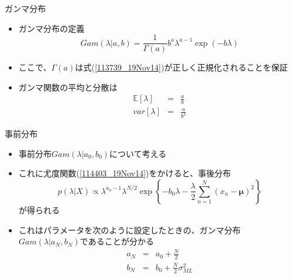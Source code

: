 \begin{frame}{ガンマ分布}
 \begin{itemize}
  \item ガンマ分布の定義
        \begin{equation}
         Gam(\lambda|a,b) = \frac{1}{\Gamma(a)}b^a\lambda^{a-1}\exp(-b\lambda)\label{113739_19Nov14}
        \end{equation}
  \item ここで、$\Gamma(a)$は式(\ref{113739_19Nov14})が正しく正規化されることを保証
  \item ガンマ関数の平均と分散は
        \begin{eqnarray}
         \mathbb{E}[\lambda] &=& \frac{a}{b}\\
         var[\lambda]& =& \frac{a}{b^2}
        \end{eqnarray}
 \end{itemize}
\end{frame}

\begin{frame}{事前分布}
 \begin{itemize}
  \item 事前分布$Gam(\lambda|a_0,b_0)$について考える
  \item これに尤度関数(\ref{114403_19Nov14})をかけると、事後分布
        \begin{equation}
         p(\lambda|X) \propto \lambda^{a_0-1}\lambda^{N/2}\exp\left\{-b_0\lambda-\frac{\lambda}{2}\sum_{n=1}^{N}(x_n-\bm{\mu})^2\right\}\label{114734_19Nov14}
        \end{equation}
        が得られる
  \item これはパラメータを次のように設定したときの、ガンマ分布$Gam(\lambda|a_N,b_N)$であることが分かる
        \begin{eqnarray}
         a_N&=& a_0 + \frac{N}{2}\label{115004_19Nov14}\\
         b_N%
         &= & b_0+\frac{N}{2}\sigma^2_{ML}\label{115046_19Nov14}
        \end{eqnarray}
 \end{itemize}
\end{frame}

